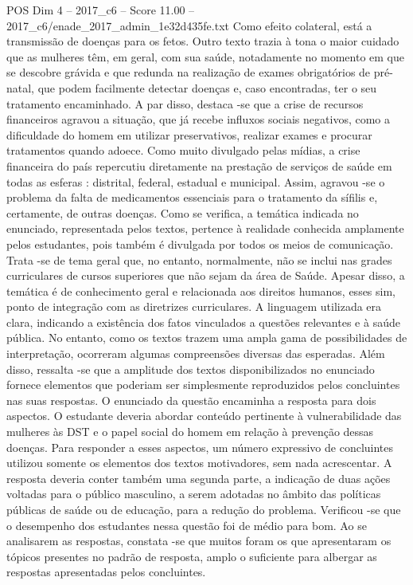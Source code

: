 \begin{textsample}{POS Dim 4 – 2017\_c6 – Score 11.00 – 2017\_c6/enade\_2017\_admin\_1e32d435fe.txt}
Como efeito colateral, está a transmissão de doenças para os fetos.
Outro texto trazia à tona o maior cuidado que as mulheres têm, em geral, com sua saúde, notadamente no momento em que se descobre grávida e que redunda na realização de exames obrigatórios de pré-natal, que podem facilmente detectar doenças e, caso encontradas, ter o seu tratamento encaminhado.
A par disso, destaca -se que a crise de recursos financeiros agravou a situação, que já recebe influxos sociais negativos, como a dificuldade do homem em utilizar preservativos, realizar exames e procurar tratamentos quando adoece.
Como muito divulgado pelas mídias, a crise financeira do país repercutiu diretamente na prestação de serviços de saúde em todas as esferas : distrital, federal, estadual e municipal.
Assim, agravou -se o problema da falta de medicamentos essenciais para o tratamento da sífilis e, certamente, de outras doenças.
Como se verifica, a temática indicada no enunciado, representada pelos textos, pertence à realidade conhecida amplamente pelos estudantes, pois também é divulgada por todos os meios de comunicação.
Trata -se de tema geral que, no entanto, normalmente, não se inclui nas grades curriculares de cursos superiores que não sejam da área de Saúde.
Apesar disso, a temática é de conhecimento geral e relacionada aos direitos humanos, esses sim, ponto de integração com as diretrizes curriculares.
A linguagem utilizada era clara, indicando a existência dos fatos vinculados a questões relevantes e à saúde pública.
No entanto, como os textos trazem uma ampla gama de possibilidades de interpretação, ocorreram algumas compreensões diversas das esperadas.
Além disso, ressalta -se que a amplitude dos textos disponibilizados no enunciado fornece elementos que poderiam ser simplesmente reproduzidos pelos concluintes nas suas respostas.
O enunciado da questão encaminha a resposta para dois aspectos.
O estudante deveria abordar conteúdo pertinente à vulnerabilidade das mulheres às DST e o papel social do homem em relação à prevenção dessas doenças.
Para responder a esses aspectos, um número expressivo de concluintes utilizou somente os elementos dos textos motivadores, sem nada acrescentar.
A resposta deveria conter também uma segunda parte, a indicação de duas ações voltadas para o público masculino, a serem adotadas no âmbito das políticas públicas de saúde ou de educação, para a redução do problema.
Verificou -se que o desempenho dos estudantes nessa questão foi de médio para bom.
Ao se analisarem as respostas, constata -se que muitos foram os que apresentaram os tópicos presentes no padrão de resposta, amplo o suficiente para albergar as respostas apresentadas pelos concluintes.

\end{textsample}

